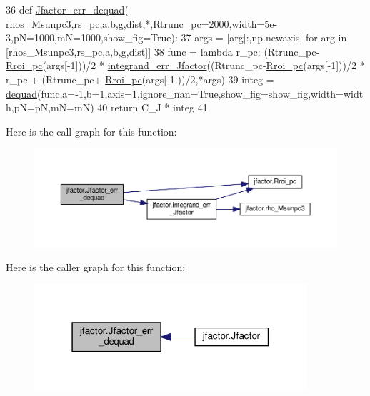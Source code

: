 \begin{DoxyCode}
36 \textcolor{keyword}{def }\hyperlink{namespacejfactor_a4d9eb98f6dca866cd6248ef6b1c308a5}{Jfactor\_err\_dequad}(
      rhos\_Msunpc3,rs\_pc,a,b,g,dist,*,Rtrunc\_pc=2000,width=5e-3,pN=1000,mN=1000,show\_fig=True): 
37     args = [arg[:,np.newaxis] \textcolor{keywordflow}{for} arg \textcolor{keywordflow}{in} [rhos\_Msunpc3,rs\_pc,a,b,g,dist]]
38     func = \textcolor{keyword}{lambda} r\_pc: (Rtrunc\_pc-\hyperlink{namespacejfactor_ae5aad7f2ac90b82740c027677d7f4ac7}{Rroi\_pc}(args[-1]))/2 * 
      \hyperlink{namespacejfactor_afb33d5b3499565b8b7c23e15f3615ec0}{integrand\_err\_Jfactor}((Rtrunc\_pc-\hyperlink{namespacejfactor_ae5aad7f2ac90b82740c027677d7f4ac7}{Rroi\_pc}(args[-1]))/2 * r\_pc + (Rtrunc\_pc+
      \hyperlink{namespacejfactor_ae5aad7f2ac90b82740c027677d7f4ac7}{Rroi\_pc}(args[-1]))/2,*args)
39     integ = \hyperlink{namespacedequad}{dequad}(func,a=-1,b=1,axis=1,ignore\_nan=\textcolor{keyword}{True},show\_fig=show\_fig,width=width,pN=pN,mN=mN)
40     \textcolor{keywordflow}{return} C\_J * integ
41 
\end{DoxyCode}
Here is the call graph for this function\+:\nopagebreak
\begin{figure}[H]
\begin{center}
\leavevmode
\includegraphics[width=350pt]{de/d47/namespacejfactor_a4d9eb98f6dca866cd6248ef6b1c308a5_cgraph}
\end{center}
\end{figure}
Here is the caller graph for this function\+:\nopagebreak
\begin{figure}[H]
\begin{center}
\leavevmode
\includegraphics[width=286pt]{de/d47/namespacejfactor_a4d9eb98f6dca866cd6248ef6b1c308a5_icgraph}
\end{center}
\end{figure}
\mbox{\label{namespacejfactor_aeb50ca469052983461a3e8382cfb4f95}} 
